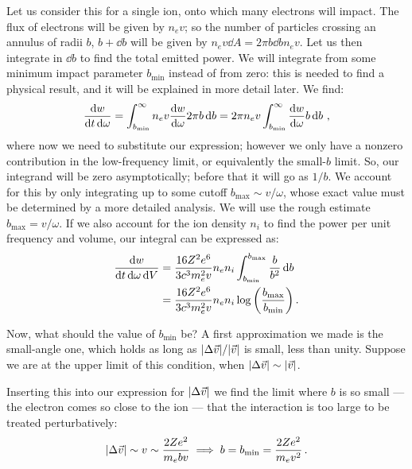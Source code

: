 \documentclass[main.tex]{subfiles}
\begin{document}
Let us consider this for a single ion, onto which many electrons will impact. 
The flux of electrons will be given by \(n_e v\); so the number of particles crossing an annulus of radii \(b\), \(b + \dd{b}\) will be given by \(n_e v \dd{A}  =2 \pi b \dd{b} n_e v\). 
Let us then integrate in \(\dd{b}\) to find the total emitted power. We will integrate from some minimum impact parameter \(b _{\text{min}}\) instead of from zero: this is needed to find a physical result, and it will be explained in more detail later. We find: 
%
\begin{align}
\frac{ \dd{w}}{ \dd{t} \dd{\omega }} = \int_{b _{\text{min}}}^{\infty }
n_e v \dv{w}{\omega } 2 \pi b \dd{b}
= 2 \pi n_e v \int_{b _{\text{min}}}^{\infty} \dv{w}{\omega } b \dd{b}
\,,
\end{align}
%
where now we need to substitute our expression; however we only have a nonzero contribution in the low-frequency limit, or equivalently the small-\(b\) limit. So, our integrand will be zero asymptotically; before that it will go as \(1/b\). We account for this by only integrating up to some cutoff \(b _{\text{max}} \sim v/ \omega \), whose exact value must be determined by a more detailed analysis. We will use the rough estimate \(b _{\text{max}} = v / \omega \). 
If we also account for the ion density \(n_i\) to find the power per unit frequency and volume, our integral can be expressed as:
%
\begin{align}
\frac{ \dd{w}}{ \dd{t} \dd{\omega } \dd{V}}
&= \frac{16 Z^2 e^{6}}{3 c^3 m_e^2 v } n_e n_i \int_{b _{\text{min}}}^{b _{\text{max}}} \frac{b}{b^2} \dd{b }  \\
&= \frac{16 Z^2 e^{6}}{3 c^3 m_e^2 v } n_e n_i
\log \qty( \frac{b _{\text{max}}}{b _{\text{min}}})
\,.
\end{align}

Now, what should the value of \(b _{\text{min}}\) be? 
A first approximation we made is the small-angle one, which holds as long as \(\abs{\Delta \vec{v}} / \abs{\vec{v}}\) is small, less than unity. Suppose we are at the upper limit of this condition, when \(\abs{\Delta \vec{v}} \sim \abs{\vec{v}}\). 

Inserting this into our expression for \(\abs{\Delta \vec{v}}\) we find the limit where \(b\) is so small --- the electron comes so close to the ion --- that the interaction is too large to be treated perturbatively: 
%
\begin{align}
\abs{\Delta \vec{v}} \sim v \sim \frac{2 Z e^2}{m_e b v} \implies b = b _{\text{min}} = \frac{2 Z e^2}{m_e v^2}
\,.
\end{align}
\end{document}
